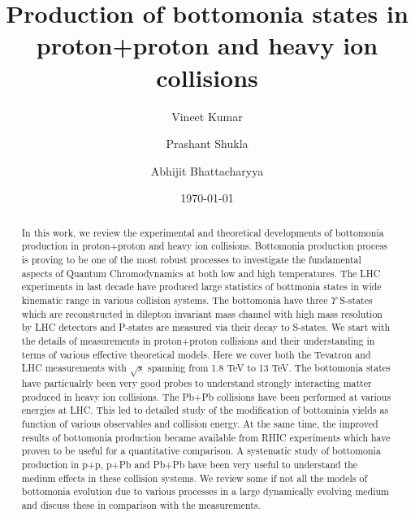 \documentclass[review]{elsarticle}
\begin{document}
  \title{Production of bottomonia states in proton+proton and heavy ion collisions}
  \author[NPD]{Vineet Kumar}
  \author[NPD,HBNI]{Prashant Shukla}
  \author[UOC]{Abhijit Bhattacharyya}
  \address[NPD]{Nuclear Physics Division, Bhabha Atomic Research Centre, Mumbai 400085, India}
  \address[HBNI]{Homi Bhabha National Institute, Anushakti Nagar, Mumbai 400094, India}
  \address[UOC]{Department of Physics, University of Calcutta, 92, A. P. C. Road Kolkata-700009, India}
  \date{\today}
\fontsize{11}{15}
\selectfont
  
\begin{abstract}
    
 In this work, we review the experimental and theoretical developments of bottomonia
production in proton+proton and heavy ion collisions. Bottomonia production
process is proving to be one of the most robust processes to investigate the
fundamental aspects of Quantum Chromodynamics at both low and high temperatures.  
The LHC experiments in last decade have produced large statistics of
bottmonia states in wide kinematic range in various collision
systems. The bottomonia have three $\Upsilon$ S-states which are
reconstructed in dilepton invariant mass channel with high mass resolution by
LHC detectors and P-states are measured via their decay to S-states. 
We start with the details of measurements in proton+proton collisions and their
understanding in terms of various effective theoretical models. Here we cover both the
Tevatron and LHC measurements with $\sqrt{s}$ spanning from 1.8 TeV to 13 TeV. 
  The bottomonia states have particualrly been very good probes to understand
strongly interacting matter produced in heavy ion collisions. The Pb+Pb
collisions have been performed at various energies at LHC. This led to
detailed study of the modification of bottominia yields as function of various observables
and collision energy. At the same time, the improved results of bottomonia
production became available from RHIC experiments which have proven to be useful
for a quantitative comparison. 
 A systematic study of bottomonia production in p+p,
p+Pb and Pb+Pb have been very useful to understand the medium effects
in these collision systems. We review some if not all the models of bottomonia
evolution due to various processes in a large dynamically evolving medium and
discuss these in comparison with the measurements. 
\end{abstract}
  
\end{document}
